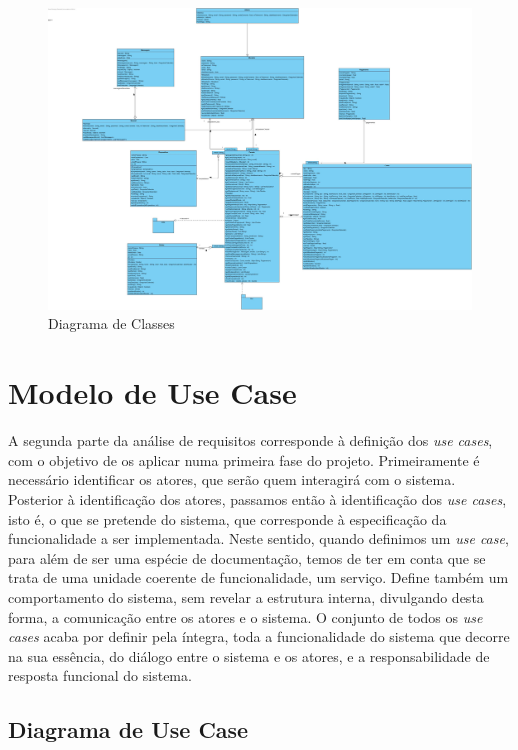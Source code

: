 \begin{figure}[htb!]
	\centering
	\includegraphics[scale=0.2]{imagens/diagramaClasses/DiagramaClasse}  
	\caption{Diagrama de Classes }  
\end{figure}


\newpage

\section{Modelo de Use Case}
A segunda parte da análise de requisitos corresponde à definição dos \textit{use cases}, com o objetivo de os aplicar numa primeira fase do projeto. Primeiramente é necessário identificar os atores, que serão quem interagirá com o sistema.
Posterior à identificação dos atores, passamos então à identificação dos \textit{use cases}, isto é, o que se pretende do sistema, que corresponde à especificação da funcionalidade a ser implementada.
Neste sentido, quando definimos um \textit{use case}, para além de ser uma espécie de documentação, temos de ter em conta que se trata de uma unidade coerente de funcionalidade, um serviço. Define também um comportamento do sistema, sem revelar a estrutura interna, divulgando desta forma, a comunicação entre os atores e o sistema.
O conjunto de todos os \textit{use cases} acaba por definir pela íntegra, toda a funcionalidade do sistema que decorre na sua essência, do diálogo entre o sistema e os atores, e a responsabilidade de resposta funcional do sistema.


\subsection{Diagrama de Use Case}

